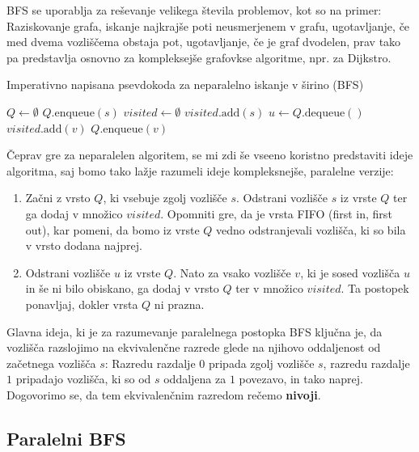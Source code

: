 \documentclass[mat1, tisk]{fmfdelo}
\begin{document}
BFS se uporablja za reševanje velikega števila problemov, kot so na primer: Raziskovanje grafa, iskanje najkrajše poti neusmerjenem v grafu,
ugotavljanje, če med dvema vozliščema obstaja pot, ugotavljanje, če je graf dvodelen, prav tako pa predstavlja osnovno za kompleksejše grafovkse
algoritme, npr. za Dijkstro.

\begin{algorithm}[H]
  \caption{Imperativno napisana psevdokoda za neparalelno iskanje v širino (BFS)}
  \label{alg:non_parallel_bfs}
  \begin{algorithmic}[1]
      \State $Q \gets \emptyset$
      \State $Q.\text{enqueue}(s)$
      \State $visited \gets \emptyset$
      \State $visited.\text{add}(s)$
        \State $u \gets Q.\text{dequeue}()$
            \State $visited.\text{add}(v)$
            \State $Q.\text{enqueue}(v)$
          \EndIf
        \EndFor
      \EndWhile
    \EndFunction
  \end{algorithmic}
\end{algorithm}

Čeprav gre za neparalelen algoritem, se mi zdi še vseeno koristno predstaviti ideje algoritma, saj bomo tako lažje 
razumeli ideje kompleksnejše, paralelne verzije:
\begin{enumerate}
  \item Začni z vrsto $Q$, ki vsebuje zgolj vozlišče $s$. Odstrani vozlišče $s$ iz vrste $Q$ ter ga dodaj v množico $visited$.
        Opomniti gre, da je vrsta FIFO (first in, first out), kar pomeni, da bomo iz vrste $Q$ vedno odstranjevali vozlišča, 
        ki so bila v vrsto dodana najprej.
  \item Odstrani vozlišče $u$ iz vrste $Q$. Nato za vsako vozlišče $v$, ki je sosed vozlišča $u$ in še ni bilo obiskano,
        ga dodaj v vrsto $Q$ ter v množico $visited$. Ta postopek ponavljaj, dokler vrsta $Q$ ni prazna.
\end{enumerate}

Glavna ideja, ki je za razumevanje paralelnega postopka BFS ključna je, da vozlišča razslojimo na ekvivalenčne razrede 
glede na njihovo oddaljenost od začetnega vozlišča $s$: Razredu razdalje $0$ pripada zgolj vozlišče $s$, razredu razdalje $1$
pripadajo vozlišča, ki so od $s$ oddaljena za $1$ povezavo, in tako naprej. Dogovorimo se, da tem ekvivalenčnim razredom rečemo \textbf{nivoji}.


\subsection{Paralelni BFS}
\end{document}
